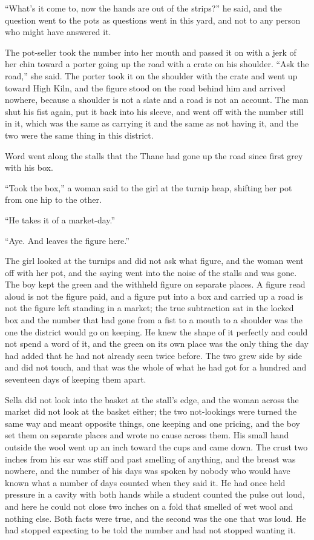 “What's it come to, now the hands are out of the strips?” he said, and the question went to the pots as questions went in this yard, and not to any person who might have answered it.

The pot-seller took the number into her mouth and passed it on with a jerk of her chin toward a porter going up the road with a crate on his shoulder. “Ask the road,” she said. The porter took it on the shoulder with the crate and went up toward High Kiln, and the figure stood on the road behind him and arrived nowhere, because a shoulder is not a slate and a road is not an account. The man shut his fist again, put it back into his sleeve, and went off with the number still in it, which was the same as carrying it and the same as not having it, and the two were the same thing in this district.

Word went along the stalls that the Thane had gone up the road since first grey with his box.

“Took the box,” a woman said to the girl at the turnip heap, shifting her pot from one hip to the other.

“He takes it of a market-day.”

“Aye. And leaves the figure here.”

The girl looked at the turnips and did not ask what figure, and the woman went off with her pot, and the saying went into the noise of the stalls and was gone. The boy kept the green and the withheld figure on separate places. A figure read aloud is not the figure paid, and a figure put into a box and carried up a road is not the figure left standing in a market; the true subtraction sat in the locked box and the number that had gone from a fist to a mouth to a shoulder was the one the district would go on keeping. He knew the shape of it perfectly and could not spend a word of it, and the green on its own place was the only thing the day had added that he had not already seen twice before. The two grew side by side and did not touch, and that was the whole of what he had got for a hundred and seventeen days of keeping them apart.

Sella did not look into the basket at the stall's edge, and the woman across the market did not look at the basket either; the two not-lookings were turned the same way and meant opposite things, one keeping and one pricing, and the boy set them on separate places and wrote no cause across them. His small hand outside the wool went up an inch toward the cups and came down. The crust two inches from his ear was stiff and past smelling of anything, and the breast was nowhere, and the number of his days was spoken by nobody who would have known what a number of days counted when they said it. He had once held pressure in a cavity with both hands while a student counted the pulse out loud, and here he could not close two inches on a fold that smelled of wet wool and nothing else. Both facts were true, and the second was the one that was loud. He had stopped expecting to be told the number and had not stopped wanting it.

